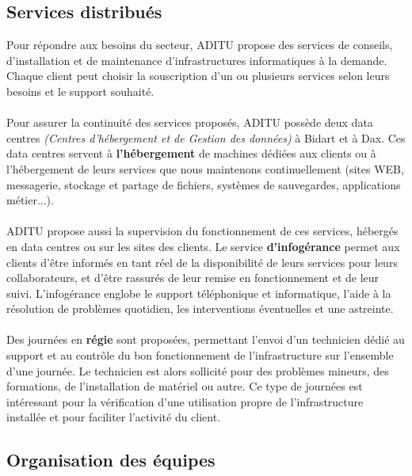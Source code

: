 \subsection{Services distribués}

Pour répondre aux besoins du secteur, ADITU propose des services de conseils, d'installation et de maintenance d'infrastructures informatiques à la demande. Chaque client peut choisir la souscription d'un ou plusieurs services selon leurs besoins et le support souhaité.
\\ \\
Pour assurer la continuité des services proposés, ADITU possède deux data centres \textit{(Centres d'hébergement et de Gestion des données)} à Bidart et à Dax. Ces data centres servent à \textbf{l'hébergement} de machines dédiées aux clients ou à l'hébergement de leurs services que nous maintenons continuellement (sites WEB, messagerie, stockage et partage de fichiers, systèmes de sauvegardes, applications métier...).
\\ \\
ADITU propose aussi la supervision du fonctionnement de ces services, hébergés en data centres ou sur les sites des clients. Le service \textbf{d'infogérance} permet aux clients d'être informés en tant réel de la disponibilité de leurs services pour leurs collaborateurs, et d'être rassurés de leur remise en fonctionnement et de leur suivi. L'infogérance englobe le support téléphonique et informatique, l'aide à la résolution de problèmes quotidien, les interventions éventuelles et une astreinte.
\\ \\
Des journées en \textbf{régie} sont proposées, permettant l'envoi d'un technicien dédié au support et au contrôle du bon fonctionnement de l'infrastructure sur l'ensemble d'une journée. Le technicien est alors sollicité pour des problèmes mineurs, des formations, de l'installation de matériel ou autre. Ce type de journées est intéressant pour la vérification d'une utilisation propre de l'infrastructure installée et pour faciliter l'activité du client.

\subsection{Organisation des équipes}

